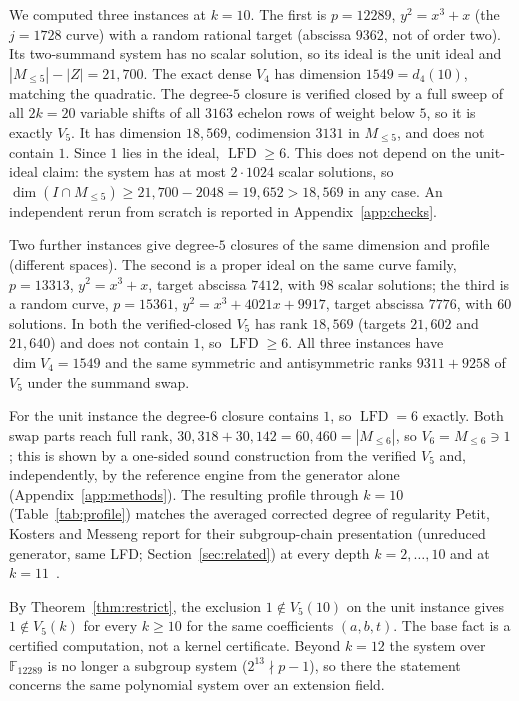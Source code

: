 \documentclass[11pt]{article}
\theoremstyle{definition}\newtheorem{definition}[theorem]{Definition}
\theoremstyle{remark}\newtheorem{remark}[theorem]{Remark}
\newcommand{\F}{\mathbb F}
\newcommand{\lfd}{\operatorname{LFD}}
\begin{document}
We computed three instances at $k=10$. The first is $p=12289$, $y^2=x^3+x$
(the $j=1728$ curve) with a random rational target (abscissa $9362$, not of
order two). Its two-summand system has no scalar solution, so its ideal is
the unit ideal and $|M_{\le5}|-|Z|=21{,}700$. The exact dense $V_4$ has
dimension $1549=d_4(10)$, matching the quadratic. The degree-$5$ closure is
verified closed by a full sweep of all $2k=20$ variable shifts of all $3163$
echelon rows of weight below $5$, so it is exactly $V_5$. It has dimension
$18{,}569$, codimension $3131$ in $M_{\le5}$, and does not contain $1$.
Since $1$ lies in the ideal, $\lfd\ge6$. This does not depend on the
unit-ideal claim: the system has at most $2\cdot1024$ scalar solutions, so
$\dim(I\cap M_{\le5})\ge21{,}700-2048=19{,}652>18{,}569$ in any case. An
independent rerun from scratch is reported in Appendix~\ref{app:checks}.

Two further instances give degree-$5$ closures of the same dimension and
profile (different spaces). The second is a proper ideal on the same curve
family, $p=13313$, $y^2=x^3+x$, target abscissa $7412$, with $98$ scalar
solutions; the third is a random curve, $p=15361$,
$y^2=x^3+4021x+9917$, target abscissa $7776$, with $60$ solutions. In both
the verified-closed $V_5$ has rank $18{,}569$ (targets $21{,}602$ and
$21{,}640$) and does not contain $1$, so $\lfd\ge6$. All three instances
have $\dim V_4=1549$ and the same symmetric and antisymmetric ranks
$9311+9258$ of $V_5$ under the summand swap.

For the unit instance the degree-$6$ closure contains $1$, so $\lfd=6$
exactly. Both swap parts reach full rank,
$30{,}318+30{,}142=60{,}460=|M_{\le6}|$, so $V_6=M_{\le6}\ni1$; this is shown
by a one-sided sound construction from the verified $V_5$ and, independently,
by the reference engine from the generator alone (Appendix~\ref{app:methods}).
The resulting profile through $k=10$ (Table~\ref{tab:profile}) matches the
averaged corrected degree of regularity Petit, Kosters and Messeng report for
their subgroup-chain presentation (unreduced generator, same LFD;
Section~\ref{sec:related}) at every depth $k=2,\ldots,10$ and at
$k=11$~\cite[Table~4]{pkm}.

By Theorem~\ref{thm:restrict}, the exclusion $1\notin V_5(10)$ on the unit
instance gives $1\notin V_5(k)$ for every $k\ge10$ for the same
coefficients $(a,b,t)$. The base fact is a certified computation, not a
kernel certificate. Beyond $k=12$ the system over $\F_{12289}$ is no longer
a subgroup system ($2^{13}\nmid p-1$), so there the statement concerns the
same polynomial system over an extension field.
\end{document}
